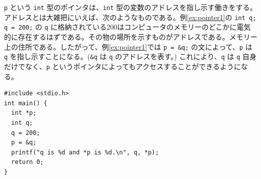 \verb|p| という \verb|int| 型のポインタは、\verb|int| 型の変数のアドレスを指し示す働きをする。アドレスとは大雑把にいえば、次のようなものである。例\ref{ex:pointer1}の \verb|int q; q = 200;| の \verb|q| に格納されている200はコンピュータのメモリーのどこかに電気的に存在するはずである。その物の場所を示すものがアドレスである。メモリー上の住所である。したがって、例\ref{ex:pointer1}では \verb|p = &q;| の文によって、\verb|p| は \verb|q| を指し示すことになる。(\verb|&q| は \verb|q| のアドレスを表す。) これにより、\verb|q| は \verb|q| 自身だけでなく、\verb|p| というポインタによってもアクセスすることができるようになる。
%
\begin{reidai}\label{ex:pointer1}
\begin{verbatim}
#include <stdio.h>
int main() {
  int *p;
  int q;
  q = 200;
  p = &q;
  printf("q is %d and *p is %d.\n", q, *p);
  return 0;
}
\end{verbatim}
\end{reidai}
%
\begin{figure}[H]
\begin{center}
\end{center}
\end{figure}

